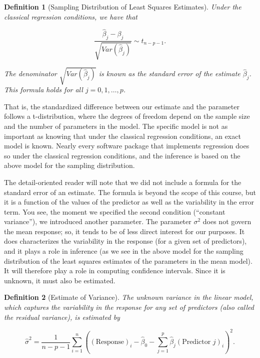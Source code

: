 \documentclass[
]{book}
\theoremstyle{plain}
\theoremstyle{mydefn}
\newtheorem{definition}{Definition}[chapter]
\theoremstyle{myexmpl}
\theoremstyle{remark}
\begin{document}
\begin{definition}[Sampling Distribution of Least Squares Estimates]
Under the classical regression conditions, we have that

\[\frac{\widehat{\beta}_j - \beta_j}{\sqrt{Var\left(\widehat{\beta}_j\right)}} \sim t_{n - p - 1}.\]

The denominator \(\sqrt{Var\left(\widehat{\beta}_j\right)}\) is known as the \emph{standard error} of the estimate \(\widehat{\beta}_j\). This formula holds for all \(j = 0, 1, \dotsc, p\).
\end{definition}

That is, the standardized difference between our estimate and the parameter follows a t-distribution, where the degrees of freedom depend on the sample size and the number of parameters in the model. The specific model is not as important as knowing that under the classical regression conditions, an exact model is known. Nearly every software package that implements regression does so under the classical regression conditions, and the inference is based on the above model for the sampling distribution.

The detail-oriented reader will note that we did not include a formula for the standard error of an estimate. The formula is beyond the scope of this course, but it is a function of the values of the predictor as well as the variability in the error term. You see, the moment we specified the second condition (``constant variance''), we introduced another parameter. The parameter \(\sigma^2\) does not govern the mean response; so, it tends to be of less direct interest for our purposes. It does characterizes the variability in the response (for a given set of predictors), and it plays a role in inference (as we see in the above model for the sampling distribution of the least squares estimates of the parameters in the mean model). It will therefore play a role in computing confidence intervals. Since it is unknown, it must also be estimated.

\begin{definition}[Estimate of Variance]
The unknown variance in the linear model, which captures the variability in the response for any set of predictors (also called the residual variance), is estimated by

\[\widehat{\sigma}^2 = \frac{1}{n-p-1} \sum\limits_{i=1}^{n} \left((\text{Response})_i - \widehat{\beta}_0 - \sum\limits_{j=1}^{p} \widehat{\beta}_j (\text{Predictor } j)_{i}\right)^2.\]
\end{definition}
\end{document}
